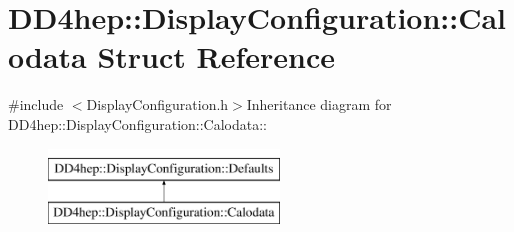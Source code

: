 \hypertarget{struct_d_d4hep_1_1_display_configuration_1_1_calodata}{
\section{DD4hep::DisplayConfiguration::Calodata Struct Reference}
\label{struct_d_d4hep_1_1_display_configuration_1_1_calodata}
}


{\ttfamily \#include $<$DisplayConfiguration.h$>$}Inheritance diagram for DD4hep::DisplayConfiguration::Calodata::\begin{figure}[H]
\begin{center}
\leavevmode
\includegraphics[height=2cm]{struct_d_d4hep_1_1_display_configuration_1_1_calodata}
\end{center}
\end{figure}
